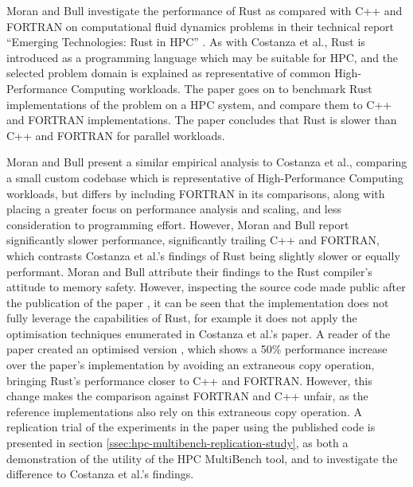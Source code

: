 Moran and Bull \cite{moranEmergingTechnologiesRust2023} investigate the performance of Rust as compared with C++ and FORTRAN on computational fluid dynamics problems in their technical report ``Emerging Technologies: Rust in HPC'' \cite{moranEmergingTechnologiesRust2023}. As with Costanza et al., Rust is introduced as a programming language which may be suitable for HPC, and the selected problem domain is explained as representative of common High-Performance Computing workloads. The paper goes on to benchmark Rust implementations of the problem on a HPC system, and compare them to C++ and FORTRAN implementations. The paper concludes that Rust is slower than C++ and FORTRAN for parallel workloads.

Moran and Bull present a similar empirical analysis to Costanza et al., comparing a small custom codebase which is representative of High-Performance Computing workloads, but differs by including FORTRAN in its comparisons, along with placing a greater focus on performance analysis and scaling, and less consideration to programming effort. However, Moran and Bull report significantly slower performance, significantly trailing C++ and FORTRAN, which contrasts Costanza et al.'s findings of Rust being slightly slower or equally performant. Moran and Bull attribute their findings to the Rust compiler's attitude to memory safety. However, inspecting the source code made public after the publication of the paper \cite{Lmoran94Eurocc_cfdCFD}, it can be seen that the implementation does not fully leverage the capabilities of Rust, for example it does not apply the optimisation techniques enumerated in Costanza et al.'s paper. A reader of the paper created an optimised version  \cite{moranPaperFalse} \cite{phazer99HerePlayground2023}, which shows a 50\% performance increase over the paper's implementation by avoiding an extraneous copy operation, bringing Rust's performance closer to C++ and FORTRAN. However, this change makes the comparison against FORTRAN and C++ unfair, as the reference implementations also rely on this extraneous copy operation. A replication trial of the experiments in the paper using the published code is presented in section \ref{ssec:hpc-multibench-replication-study}, as both a demonstration of the utility of the HPC MultiBench tool, and to investigate the difference to Costanza et al.'s findings. %


